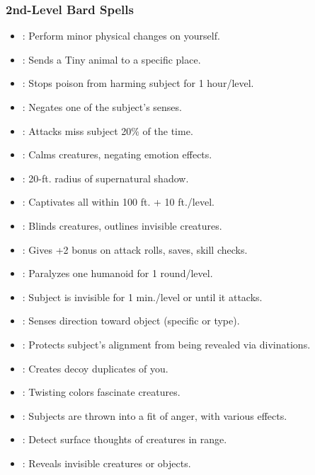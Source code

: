 \subsubsection{2nd-Level Bard Spells}
\begin{itemize}
\item {}: Perform minor physical changes on yourself.
\item {}: Sends a Tiny animal to a specific place.
\item {}: Stops poison from harming subject for 1 hour/level.
\item {}: Negates one of the subject's senses.
\item {}: Attacks miss subject 20\% of the time.
\item {}: Calms creatures, negating emotion effects.
\item {}: 20-ft. radius of supernatural shadow.
\item {}: Captivates all within 100 ft. + 10 ft./level.
\item {}: Blinds creatures, outlines invisible creatures.
\item {}: Gives +2 bonus on attack rolls, saves, skill checks.
\item {}: Paralyzes one humanoid for 1 round/level.
\item {}: Subject is invisible for 1 min./level or until it attacks.
\item {}: Senses direction toward object (specific or type).
\item {}: Protects subject's alignment from being revealed via divinations.
\item {}: Creates decoy duplicates of you.
\item {}: Twisting colors fascinate creatures.
\item {}: Subjects are thrown into a fit of anger, with various effects.
\item {}: Detect surface thoughts of creatures in range.
\item {}: Reveals invisible creatures or objects.

\end{itemize}
